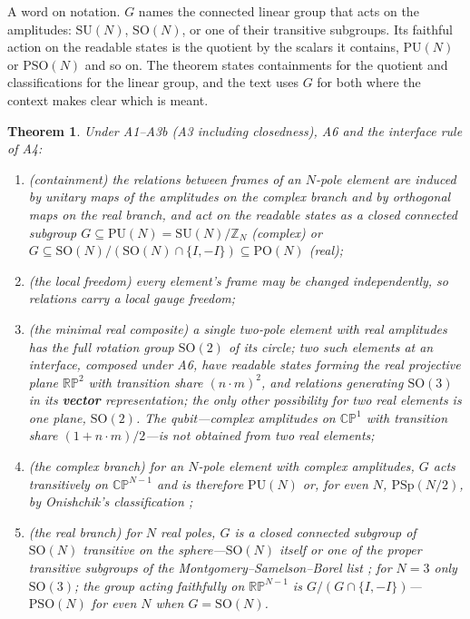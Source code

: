 \documentclass[11pt,a4paper]{article}
\theoremstyle{plain}
\newtheorem{theorem}{Theorem}
\theoremstyle{definition}
\theoremstyle{remark}
\newcommand{\RP}{\mathbb{RP}}
\newcommand{\CP}{\mathbb{CP}}
\newcommand{\SO}{\mathrm{SO}}
\newcommand{\SU}{\mathrm{SU}}
\newcommand{\PU}{\mathrm{PU}}
\newcommand{\PSp}{\mathrm{PSp}}
\newcommand{\PSO}{\mathrm{PSO}}
\begin{document}
A word on notation. $G$ names the connected linear group that acts on the amplitudes: $\SU(N)$, $\SO(N)$, or one of their transitive subgroups. Its faithful action on the readable states is the quotient by the scalars it contains, $\PU(N)$ or $\PSO(N)$ and so on. The theorem states containments for the quotient and classifications for the linear group, and the text uses $G$ for both where the context makes clear which is meant.

\begin{theorem}\label{thm:group}
Under A1--A3b (A3 including closedness), A6 and the interface rule of A4:
\begin{enumerate}[label=(\roman*),leftmargin=2em]
\item (containment) the relations between frames of an $N$-pole element are induced by unitary maps of the amplitudes on the complex branch and by orthogonal maps on the real branch, and act on the readable states as a closed connected subgroup $G\subseteq\PU(N)=\SU(N)/\mathbb{Z}_N$ (complex) or $G\subseteq\SO(N)/(\SO(N)\cap\{I,-I\})\subseteq\mathrm{PO}(N)$ (real);
\item (the local freedom) every element's frame may be changed independently, so relations carry a local gauge freedom;
\item (the minimal real composite) a single two-pole element with real amplitudes has the full rotation group $\SO(2)$ of its circle; two such elements at an interface, composed under A6, have readable states forming the real projective plane $\RP^2$ with transition share $(n\cdot m)^2$, and relations generating $\SO(3)$ in its \textbf{vector} representation; the only other possibility for two real elements is one plane, $\SO(2)$. The qubit---complex amplitudes on $\CP^1$ with transition share $(1+n\cdot m)/2$---is \emph{not} obtained from two real elements;
\item (the complex branch) for an $N$-pole element with complex amplitudes, $G$ acts transitively on $\CP^{N-1}$ and is therefore $\PU(N)$ or, for even $N$, $\PSp(N/2)$, by Onishchik's classification \cite{onishchik};
\item (the real branch) for $N$ real poles, $G$ is a closed connected subgroup of $\SO(N)$ transitive on the sphere---$\SO(N)$ itself or one of the proper transitive subgroups of the Montgomery--Samelson--Borel list \cite{ms,borel}; for $N=3$ only $\SO(3)$; the group acting faithfully on $\RP^{N-1}$ is $G/(G\cap\{I,-I\})$---$\PSO(N)$ for even $N$ when $G=\SO(N)$.
\end{enumerate}
\end{theorem}
\end{document}
